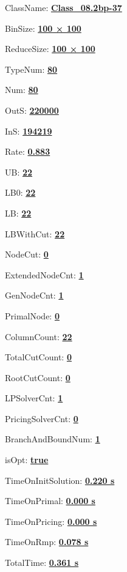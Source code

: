 \documentclass[11pt]{article}
\begin{document}
\pagestyle{empty}


ClassName: \underline{\textbf{Class_08.2bp-37}}
\par
BinSize: \underline{\textbf{100 × 100}}
\par
ReduceSize: \underline{\textbf{100 × 100}}
\par
TypeNum: \underline{\textbf{80}}
\par
Num: \underline{\textbf{80}}
\par
OutS: \underline{\textbf{220000}}
\par
InS: \underline{\textbf{194219}}
\par
Rate: \underline{\textbf{0.883}}
\par
UB: \underline{\textbf{22}}
\par
LB0: \underline{\textbf{22}}
\par
LB: \underline{\textbf{22}}
\par
LBWithCut: \underline{\textbf{22}}
\par
NodeCut: \underline{\textbf{0}}
\par
ExtendedNodeCnt: \underline{\textbf{1}}
\par
GenNodeCnt: \underline{\textbf{1}}
\par
PrimalNode: \underline{\textbf{0}}
\par
ColumnCount: \underline{\textbf{22}}
\par
TotalCutCount: \underline{\textbf{0}}
\par
RootCutCount: \underline{\textbf{0}}
\par
LPSolverCnt: \underline{\textbf{1}}
\par
PricingSolverCnt: \underline{\textbf{0}}
\par
BranchAndBoundNum: \underline{\textbf{1}}
\par
isOpt: \underline{\textbf{true}}
\par
TimeOnInitSolution: \underline{\textbf{0.220 s}}
\par
TimeOnPrimal: \underline{\textbf{0.000 s}}
\par
TimeOnPricing: \underline{\textbf{0.000 s}}
\par
TimeOnRmp: \underline{\textbf{0.078 s}}
\par
TotalTime: \underline{\textbf{0.361 s}}
\par
\newpage


\end{document}
